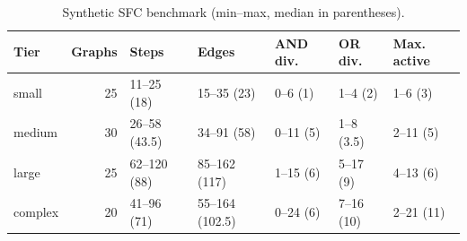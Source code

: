 \begin{table}[t]
\centering
\caption{Synthetic SFC benchmark (min--max, median in parentheses).}
\label{tab:benchmark}
\small
\begin{tabular}{lrlllll}
\toprule
Tier & Graphs & Steps & Edges & AND div. & OR div. & Max. active \\
\midrule
small & 25 & 11--25 (18) & 15--35 (23) & 0--6 (1) & 1--4 (2) & 1--6 (3) \\
medium & 30 & 26--58 (43.5) & 34--91 (58) & 0--11 (5) & 1--8 (3.5) & 2--11 (5) \\
large & 25 & 62--120 (88) & 85--162 (117) & 1--15 (6) & 5--17 (9) & 4--13 (6) \\
complex & 20 & 41--96 (71) & 55--164 (102.5) & 0--24 (6) & 7--16 (10) & 2--21 (11) \\
\bottomrule
\end{tabular}
\end{table}
